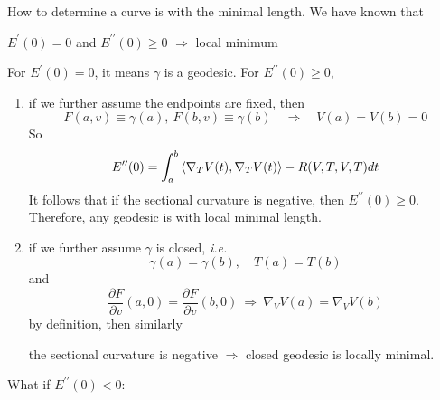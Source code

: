 How to determine a curve is with the minimal length. We have known that
\begin{center}
	$E^\prime(0) = 0$ and $E^{\prime\prime}(0) \geq 0$ $\Rightarrow$ local minimum
\end{center}
For $E^\prime(0) = 0$, it means $\gamma$ is a geodesic. For $E^{\prime\prime}(0) \geq 0$,
\begin{enumerate}[label=(\roman{*})]
 	\item if we further assume the endpoints are fixed, then
 	\begin{equation*}
 		F(a,v) \equiv \gamma(a),~ F(b,v)\equiv \gamma(b) \quad \Rightarrow\quad V(a) =V(b) =0
 	\end{equation*}
 	So
 	\begin{equation*}
 		E^{\prime\prime}(0) = \int_a^b \left\langle \nabla_TV(t),\nabla_TV(t) \right\rangle -R(V,T,V,T)dt
 	\end{equation*}
 	It follows that if the sectional curvature is negative, then $E^{\prime\prime}(0) \geq 0$. Therefore, any geodesic is with local minimal length.

 	\item if we further assume $\gamma$ is closed, \emph{i.e.}
 	\begin{equation*}
 		\gamma(a) = \gamma(b),\quad T(a) = T(b)
 	\end{equation*}
 	and 
 	\begin{equation*}
 		\frac{\partial F}{\partial v}(a,0) = \frac{\partial F}{\partial v}(b,0)~\Rightarrow~\nabla_VV(a) = \nabla_VV(b)
 	\end{equation*}
 	by definition, then similarly
 	\begin{center}
 		the sectional curvature is negative $\Rightarrow$ closed geodesic is locally minimal.
 	\end{center}
\end{enumerate} 
What if $E^{\prime\prime}(0) < 0$: 
